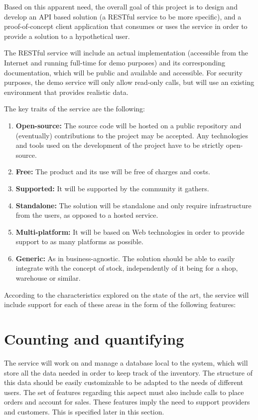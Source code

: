 Based on this apparent need, the overall goal of this project is to design and develop an API based solution (a RESTful service to be more specific), and a proof-of-concept client application that consumes or uses the service in order to provide a solution to a hypothetical user.

The RESTful service will include an actual implementation (accessible from the Internet and running full-time for demo purposes) and its corresponding documentation, which will be public and available and accessible. For security purposes, the demo service will only allow read-only calls, but will use an existing environment that provides realistic data. 

The key traits of the service are the following:

\begin{enumerate}
\item \textbf{Open-source:}
The source code will be hosted on a public repository and (eventually) contributions to the project may be accepted. Any technologies and tools used  on the development of the project have to be strictly open-source.

\item \textbf{Free:}
The product and its use will be free of charges and costs.

\item \textbf{Supported:}
It will be supported by the community it gathers.

\item \textbf{Standalone:}
The solution will be standalone and only require infrastructure from the users, as opposed to a hosted service.

\item \textbf{Multi-platform:}
It will be based on Web technologies in order to provide support to as many platforms as possible.

\item \textbf{Generic:}
As in business-agnostic. The solution should be able to easily integrate with the concept of stock, independently of it being for a shop, warehouse or similar.
\end{enumerate}

According to the characteristics explored on the state of the art, the service will include support for each of these areas in the form of the following features:
\section{Counting and quantifying}
The service will work on and manage a database local to the system, which will store all the data needed in order to keep track of the inventory. The structure of this data should be easily customizable to be adapted to the needs of different users. The set of features regarding this aspect must also include calls to place orders and account for sales. These features imply the need to support providers and customers. This is specified later in this section.
